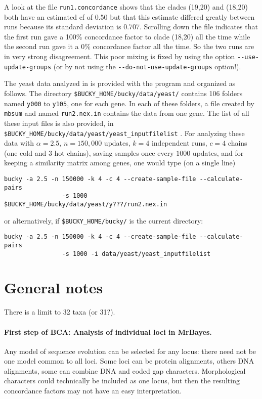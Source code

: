 \documentclass[12pt,english,final,letterpaper]{article}
\begin{document}
A look at the file {\tt run1.concordance} shows that the clades (19,20) and
(18,20) both have an estimated {\sc cf} of 0.50 but that this estimate differed
greatly between runs because its standard deviation is 0.707. Scrolling down
the file indicates that the first run gave a 100\% concordance factor to clade
(18,20) all the time while the second run gave it a 0\% concordance factor 
all the time.
So the two runs are in very strong disagreement. 
This poor mixing is fixed by using the option
\verb+--use-update-groups+ (or by not using the 
\verb+--do-not-use-update-groups+ option!).
\medskip

The yeast data analyzed in \cite{ane-etal-2007} is provided with the program
and organized as follows. The directory
\verb+$BUCKY_HOME/bucky/data/yeast/+ %
contains 106 folders named {\tt y000} to {\tt y105}, one for each gene. 
In each of these folders, a file created by {\tt mbsum} and named 
{\tt run2.nex.in} contains the data from one gene.
The list of all these input files is also provided, in 
\verb+$BUCKY_HOME/bucky/data/yeast/yeast_inputfilelist+ .
For analyzing these data with $\alpha=2.5$, 
$n=150,000$ updates, $k=4$ independent runs, $c=4$ chains 
(one cold and 3 hot chains),
saving samples once every $1000$ updates, and for keeping a similarity 
matrix among genes, one would type (on a single line)
\begin{verbatim}
bucky -a 2.5 -n 150000 -k 4 -c 4 --create-sample-file --calculate-pairs
                -s 1000   $BUCKY_HOME/bucky/data/yeast/y???/run2.nex.in
\end{verbatim}%
or alternatively, if \verb+$BUCKY_HOME/bucky/+ is the current directory:%
\begin{verbatim}
bucky -a 2.5 -n 150000 -k 4 -c 4 --create-sample-file --calculate-pairs
                -s 1000 -i data/yeast/yeast_inputfilelist
\end{verbatim}

\section{General notes}

There is a limit to 32 taxa (or 31?).

\paragraph{First step of BCA: Analysis of individual loci in MrBayes.}
Any model of sequence evolution can be selected for any locus: there need 
not be one model common to all loci. Some loci can be protein alignments,
others DNA alignments, some can combine DNA and coded gap characters.
Morphological characters could technically be included as one locus, 
but then the resulting concordance factors may not have an
easy interpretation.
\end{document}
